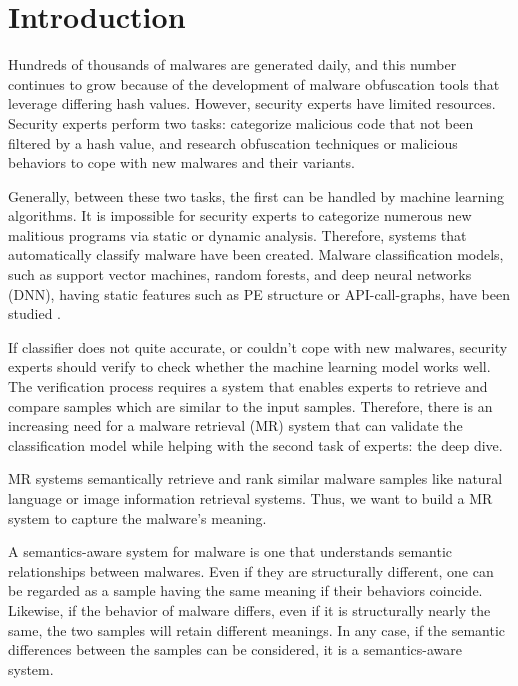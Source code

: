 \section{Introduction}

Hundreds of thousands of malwares are generated daily, and this number continues to grow because of the development of malware obfuscation tools that leverage differing hash values. However, security experts have limited resources. Security experts perform two tasks: categorize malicious code that not been filtered by a hash value, and research obfuscation techniques or malicious behaviors to cope with new malwares and their variants.

Generally, between these two tasks, the first can be handled by machine learning algorithms. It is impossible for security experts to categorize numerous new malitious programs via static or dynamic analysis. Therefore, systems that automatically classify malware have been created. Malware classification models, such as support vector machines, random forests, and deep neural networks (DNN), having static features such as PE structure or API-call-graphs, have been studied \cite{chen2012malware, park2010fast, bai2014malware, yuan2014droid, saxe2015deep}.

If classifier does not quite accurate, or couldn't cope with new malwares, security experts should verify to check whether the machine learning model works well. The verification process requires a system that enables experts to retrieve and compare samples which are similar to the input samples. Therefore, there is an increasing need for a malware retrieval (MR) system that can validate the classification model while helping with the second task of experts: the deep dive.

MR systems semantically retrieve and rank similar malware samples like natural language or image information retrieval systems. Thus, we want to build a MR system to capture the malware’s meaning.

A semantics-aware system for malware is one that understands semantic relationships between malwares. Even if they are structurally different, one can be regarded as a sample having the same meaning if their behaviors coincide. Likewise, if the behavior of malware differs, even if it is structurally nearly the same, the two samples will retain different meanings. In any case, if the semantic differences between the samples can be considered, it is a semantics-aware system.
 
